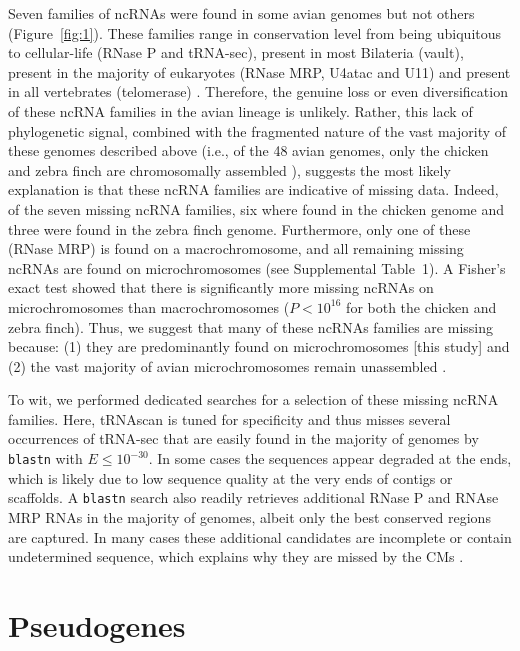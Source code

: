 \documentclass[10pt]{bmc_article}
\newenvironment{bmcformat}{\begin{raggedright}\baselineskip20pt\sloppy\setboolean{publ}{false}}{\end{raggedright}\baselineskip20pt\sloppy}
\begin{document}
\begin{bmcformat}
Seven families of ncRNAs were found in some avian genomes but not
others (Figure~\ref{fig:1}). These families range in conservation level
from being ubiquitous to cellular-life (RNase P and tRNA-sec), present
in most Bilateria (vault), present in the majority of eukaryotes
(RNase MRP, U4atac and U11) and present in all vertebrates
(telomerase) \cite{Hoeppner:2012}. Therefore, the genuine loss or even
diversification of these ncRNA families in the avian lineage is
unlikely. Rather, this lack of phylogenetic signal, combined with the
fragmented nature of the vast majority of these genomes described
above (i.e., of the 48 avian genomes, only the chicken and zebra finch
are chromosomally assembled \cite{birds:14,Warren:2010}), suggests the most likely
explanation is that these ncRNA families are indicative of missing
data. Indeed, of the seven missing ncRNA families, six where found in
the chicken genome and three were found in the zebra finch
genome. Furthermore, only one of these (RNase MRP) is found on a
macrochromosome, and all remaining missing ncRNAs are found on
microchromosomes (see Supplemental Table~1). A Fisher’s exact test
showed that there is significantly more missing ncRNAs on
microchromosomes than macrochromosomes ($P<10^{16}$ for both the
chicken and zebra finch). Thus, we suggest that many of
these ncRNAs families are missing because: (1) they are predominantly
found on microchromosomes [this study] and (2) the vast majority of
avian microchromosomes remain unassembled \cite{birds:14,Ellegren:2005}.

To wit, we performed dedicated searches for a selection of these
missing ncRNA families. Here, tRNAscan is tuned for specificity and
thus misses several occurrences of tRNA-sec that are easily found in
the majority of genomes by \texttt{blastn} with $E\le 10^{-30}$. In some cases the
sequences appear degraded at the ends, which is likely due to low
sequence quality at the very ends of contigs or scaffolds. A \texttt{blastn}
search also readily retrieves additional RNase P and RNAse MRP RNAs in
the majority of genomes, albeit only the best conserved regions are
captured. In many cases these additional candidates are incomplete or
contain undetermined sequence, which explains why they are missed by
the CMs \cite{Stadler:09b,Kolbe:2009}.



\section*{Pseudogenes}


\end{bmcformat}
\end{document}
